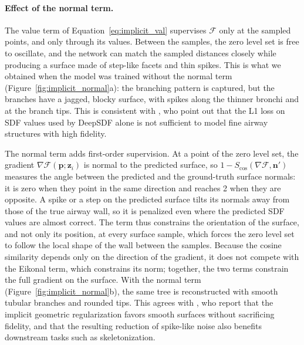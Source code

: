 \paragraph{Effect of the normal term.}   %
The value term of Equation~\eqref{eq:implicit_val} supervises $\mathcal{F}$ only at the
sampled points, and only through its values. Between the samples, the zero level set is
free to oscillate, and the network can match the sampled distances closely while producing
a surface made of step-like facets and thin spikes. This is what we obtained when the model
was trained without the normal term (Figure~\ref{fig:implicit_normal}a): the branching
pattern is captured, but the branches have a jagged, blocky surface, with spikes along the
thinner bronchi and at the branch tips. This is consistent with \citet{zhang2024}, who
point out that the L1 loss on SDF values used by DeepSDF alone is not sufficient to model
fine airway structures with high fidelity.

The normal term adds first-order supervision. At a point of the zero level set, the
gradient $\nabla\mathcal{F}(\mathbf{p}; \mathbf{z}_i)$ is normal to the predicted surface,
so $1 - S_{\cos}(\nabla\mathcal{F}, \mathbf{n}')$ measures the angle between the predicted
and the ground-truth surface normals: it is zero when they point in the same direction and
reaches 2 when they are opposite. A spike or a step on the predicted surface tilts its
normals away from those of the true airway wall, so it is penalized even where the
predicted SDF values are almost correct. The term thus constrains the orientation of the
surface, and not only its position, at every surface sample, which forces the zero level set
to follow the local shape of the wall between the samples. Because the cosine similarity
depends only on the direction of the gradient, it does not compete with the Eikonal term,
which constrains its norm; together, the two terms constrain the full gradient on the
surface. With the normal term (Figure~\ref{fig:implicit_normal}b), the same tree is
reconstructed with smooth tubular branches and rounded tips. This agrees with
\citet{zhang2024}, who report that the implicit geometric regularization favors smooth
surfaces without sacrificing fidelity, and that the resulting reduction of spike-like noise
also benefits downstream tasks such as skeletonization.

